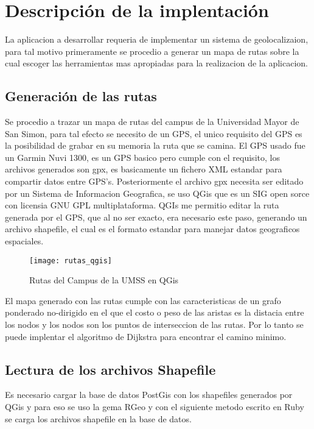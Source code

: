 \chapter{Descripci\'on de la implentaci\'on} %
\label{cha:descripcion_de_la_implentacion}



  La aplicacion a desarrollar requeria de implementar un sistema de geolocalizaion, para tal motivo primeramente se procedio a generar un mapa de rutas sobre la cual escoger las herramientas mas apropiadas para la realizacion de la aplicacion.

  \section{Generaci\'on de las rutas} %
  \label{sec:generacion_de_las_rutas}
    Se procedio a trazar un mapa de rutas del campus de la Universidad Mayor de San Simon, para tal efecto se necesito de un GPS, el unico requisito del GPS es la posibilidad de grabar en su memoria la ruta que se camina. El GPS usado fue un Garmin Nuvi 1300, es un GPS basico pero cumple con el requisito, los archivos generados son gpx, es basicamente un fichero XML estandar para compartir datos entre GPS's.
    Posteriormente
    el archivo gpx necesita ser editado por un Sistema de Informacion Geografica, se uso QGis que es un SIG open sorce con licensia  GNU GPL multiplataforma. QGIs me permitio editar la ruta generada por el GPS, que al no ser exacto, era necesario este paso, generando un archivo shapefile, el cual es el formato estandar para manejar datos geograficos espaciales.

    \begin{figure}[!ht]
      \begin{center}
        \texttt{[image: rutas\_qgis]}
      \end{center}
      \caption{Rutas del Campus de la UMSS en QGis}
      \label{fig:rutas}
    \end{figure}

    El mapa generado con las rutas cumple con las caracteristicas de un grafo ponderado no-dirigido en el que el costo o peso de las aristas es la distacia entre los nodos y los nodos son los puntos de interseccion de las rutas. Por lo tanto se puede implentar el algoritmo de Dijkstra para encontrar el camino minimo.

  \section{Lectura de los archivos Shapefile} %
  \label{sec:lectura_de_los_archivos_shapefile}
    Es necesario cargar la base de datos PostGis con los shapefiles generados por QGis y para eso se uso la gema RGeo y con el siguiente metodo escrito en Ruby se carga los archivos shapefile en la base de datos.

